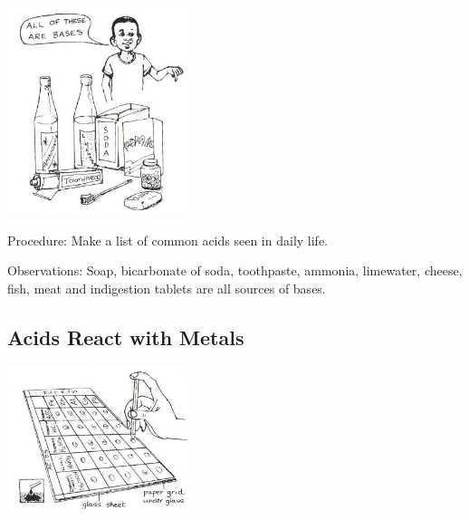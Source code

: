 \begin{multicols}{2}
\begin{center}
\includegraphics[width=0.4\textwidth]{./img/source/bases-daily.jpg}
\end{center}

\begin{description*}
\item[Procedure:]{Make a list of common acids seen in daily life.}
\item[Observations:]{Soap, bicarbonate of soda, toothpaste, ammonia, limewater, cheese, fish, meat and indigestion tablets are all sources of bases.}
\end{description*}

\subsection{Acids React with Metals} 

\begin{center}
\includegraphics[width=0.4\textwidth]{./img/source/acid-metals.jpg}
\end{center}


\end{multicols}
